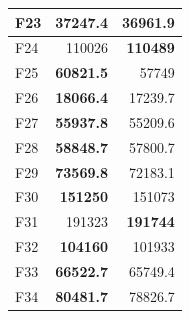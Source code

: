 \begin{table}[]
\begin{tabular}{l|r|r|}
\multicolumn{1}{|l|}{\cellcolor[HTML]{FCE6AB}F23}  & \cellcolor[HTML]{D3FFB6}\textbf{37247.4}                 & 36961.9                                                   \\ \hline
\multicolumn{1}{|l|}{\cellcolor[HTML]{FCE6AB}F24}  & 110026                                                   & \cellcolor[HTML]{D3FFB6}\textbf{110489}                   \\ \hline
\multicolumn{1}{|l|}{\cellcolor[HTML]{FCE6AB}F25}  & \cellcolor[HTML]{D3FFB6}\textbf{60821.5}                 & 57749                                                     \\ \hline
\multicolumn{1}{|l|}{\cellcolor[HTML]{FCE6AB}F26}  & \cellcolor[HTML]{D3FFB6}\textbf{18066.4}                 & 17239.7                                                   \\ \hline
\multicolumn{1}{|l|}{\cellcolor[HTML]{FCE6AB}F27}  & \cellcolor[HTML]{D3FFB6}\textbf{55937.8}                 & 55209.6                                                   \\ \hline
\multicolumn{1}{|l|}{\cellcolor[HTML]{FCE6AB}F28}  & \cellcolor[HTML]{D3FFB6}\textbf{58848.7}                 & 57800.7                                                   \\ \hline
\multicolumn{1}{|l|}{\cellcolor[HTML]{FCE6AB}F29}  & \cellcolor[HTML]{D3FFB6}\textbf{73569.8}                 & 72183.1                                                   \\ \hline
\multicolumn{1}{|l|}{\cellcolor[HTML]{FCE6AB}F30}  & \cellcolor[HTML]{D3FFB6}\textbf{151250}                  & 151073                                                    \\ \hline
\multicolumn{1}{|l|}{\cellcolor[HTML]{FCE6AB}F31}  & 191323                                                   & \cellcolor[HTML]{D3FFB6}\textbf{191744}                   \\ \hline
\multicolumn{1}{|l|}{\cellcolor[HTML]{FCE6AB}F32}  & \cellcolor[HTML]{D3FFB6}\textbf{104160}                  & 101933                                                    \\ \hline
\multicolumn{1}{|l|}{\cellcolor[HTML]{FCE6AB}F33}  & \cellcolor[HTML]{D3FFB6}\textbf{66522.7}                 & 65749.4                                                   \\ \hline
\multicolumn{1}{|l|}{\cellcolor[HTML]{FCE6AB}F34}  & \cellcolor[HTML]{D3FFB6}\textbf{80481.7}                 & 78826.7                                                   \\ \hline

\end{tabular}
\end{table}
